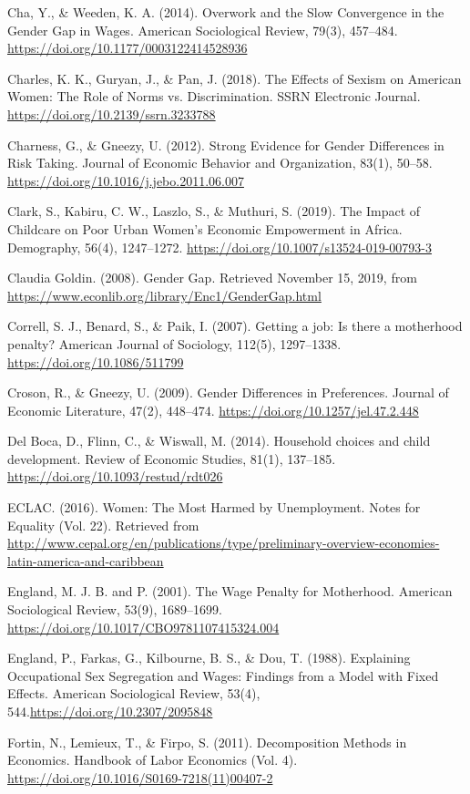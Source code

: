 Cha, Y., \& Weeden, K. A. (2014). Overwork and the Slow Convergence in the Gender Gap in Wages. American Sociological Review, 79(3), 457–484. \url{https://doi.org/10.1177/0003122414528936}

Charles, K. K., Guryan, J., \& Pan, J. (2018). The Effects of Sexism on American Women: The Role of Norms vs. Discrimination. SSRN Electronic Journal. \url{https://doi.org/10.2139/ssrn.3233788}

Charness, G., \& Gneezy, U. (2012). Strong Evidence for Gender Differences in Risk Taking. Journal of Economic Behavior and Organization, 83(1), 50–58. \url{https://doi.org/10.1016/j.jebo.2011.06.007}

Clark, S., Kabiru, C. W., Laszlo, S., \& Muthuri, S. (2019). The Impact of Childcare on Poor Urban Women's Economic Empowerment in Africa. Demography, 56(4), 1247–1272. \url{https://doi.org/10.1007/s13524-019-00793-3}

Claudia Goldin. (2008). Gender Gap. Retrieved November 15, 2019, from \url{https://www.econlib.org/library/Enc1/GenderGap.html}

Correll, S. J., Benard, S., \& Paik, I. (2007). Getting a job: Is there a motherhood penalty? American Journal of Sociology, 112(5), 1297–1338. \url{https://doi.org/10.1086/511799}

Croson, R., \& Gneezy, U. (2009). Gender Differences in Preferences. Journal of Economic Literature, 47(2), 448–474. \url{https://doi.org/10.1257/jel.47.2.448}

Del Boca, D., Flinn, C., \& Wiswall, M. (2014). Household choices and child development. Review of Economic Studies, 81(1), 137–185. \url{https://doi.org/10.1093/restud/rdt026}

ECLAC. (2016). Women: The Most Harmed by Unemployment. Notes for Equality (Vol. 22). Retrieved from \url{http://www.cepal.org/en/publications/type/preliminary-overview-economies-latin-america-and-caribbean}

England, M. J. B. and P. (2001). The Wage Penalty for Motherhood. American Sociological Review, 53(9), 1689–1699. \url{https://doi.org/10.1017/CBO9781107415324.004}

England, P., Farkas, G., Kilbourne, B. S., \& Dou, T. (1988). Explaining Occupational Sex Segregation and Wages: Findings from a Model with Fixed Effects. American Sociological Review, 53(4), 544.\url{https://doi.org/10.2307/2095848}

Fortin, N., Lemieux, T., \& Firpo, S. (2011). Decomposition Methods in Economics. Handbook of Labor Economics (Vol. 4). \url{https://doi.org/10.1016/S0169-7218(11)00407-2}

